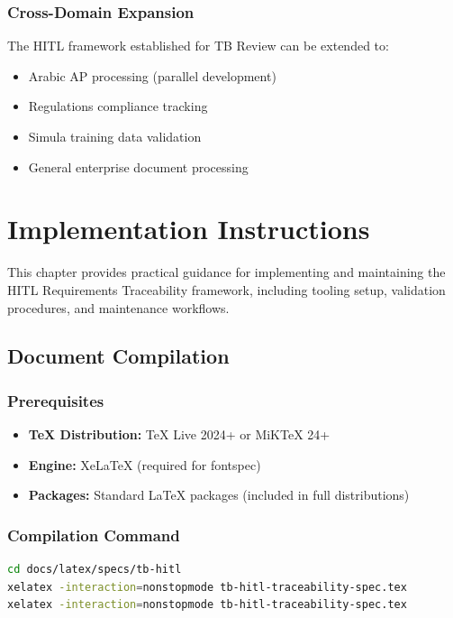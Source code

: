 \documentclass[11pt,a4paper,twoside]{report}
\begin{document}
\subsection{Cross-Domain Expansion}

The HITL framework established for TB Review can be extended to:

\begin{itemize}[noitemsep]
\item Arabic AP processing (parallel development)
\item Regulations compliance tracking
\item Simula training data validation
\item General enterprise document processing
\end{itemize}
\chapter{Implementation Instructions}
\label{ch:implementation-instructions}

This chapter provides practical guidance for implementing and maintaining
the HITL Requirements Traceability framework, including tooling setup,
validation procedures, and maintenance workflows.

\section{Document Compilation}
\label{sec:document-compilation}

\subsection{Prerequisites}

\begin{itemize}[noitemsep]
\item \textbf{TeX Distribution:} TeX Live 2024+ or MiKTeX 24+
\item \textbf{Engine:} XeLaTeX (required for fontspec)
\item \textbf{Packages:} Standard LaTeX packages (included in full distributions)
\end{itemize}

\subsection{Compilation Command}

\begin{lstlisting}[language=bash,basicstyle=\ttfamily\small]
cd docs/latex/specs/tb-hitl
xelatex -interaction=nonstopmode tb-hitl-traceability-spec.tex
xelatex -interaction=nonstopmode tb-hitl-traceability-spec.tex
\end{lstlisting}
\end{document}
